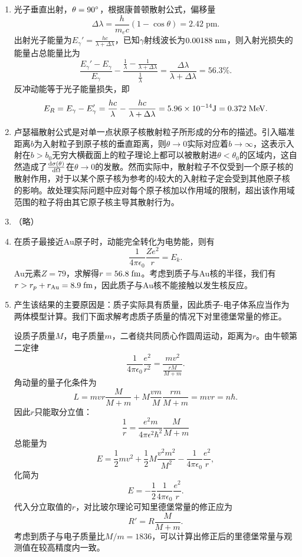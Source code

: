 \begin{enumerate}[label=1.\arabic*, leftmargin=-0.5mm]
\item
光子垂直出射，$\theta=90^\circ$，根据康普顿散射公式，偏移量
\[\Delta\lambda = \frac{h}{m_e c}(1-\cos\theta) = 2.42\;\mathrm{pm}.\]
出射光子能量为$E_\gamma' = \frac{hc}{\lambda+\Delta\lambda}$，已知$\gamma$射线波长为$0.00188\;\mathrm{nm}$，则入射光损失的能量占总能量比为
\[\frac{E_\gamma'-E_\gamma}{E_\gamma} - \frac{\frac{1}{\lambda}-\frac{1}{\lambda+\Delta\lambda}}{\frac{1}{\lambda}} = \frac{\Delta\lambda}{\lambda+\Delta\lambda} = 56.3\%.\]
反冲动能等于光子能量损失，即
\[E_R = E_\gamma-E_\gamma' = \frac{hc}{\lambda}-\frac{hc}{\lambda+\Delta\lambda} = 5.96\times 10^{-14}\mathrm{J} = 0.372\;\mathrm{MeV}.\]

\item
卢瑟福散射公式是对单一点状原子核散射粒子所形成的分布的描述。引入瞄准距离$b$为入射粒子到原子核的垂直距离，则$\theta \rightarrow 0$实际对应着$b \rightarrow \infty$，这表示入射在$b>b_0$无穷大横截面上的粒子理论上都可以被散射进$\theta < \theta_0$的区域内，这自然造成了$\dv{\sigma(\theta)}{\Omega}$在$\theta \rightarrow 0$的发散。然而实际中，散射粒子不仅受到一个原子核的散射作用，对于以某个原子核为参考的$b$较大的入射粒子定会受到其他原子核的影响。故处理实际问题中应对每个原子核加以作用域的限制，超出该作用域范围的粒子将由其它原子核主导其散射行为。

\item
（略）

\item
在质子最接近Au原子时，动能完全转化为电势能，则有
\[\frac{1}{4\pi\epsilon_0}\frac{Ze^2}{r} = E_k.\]
Au元素$Z=79$，求解得$r=56.8\;\mathrm{fm}$。考虑到质子与Au核的半径，我们有$r>r_p+r_\mathrm{Au} = 8.9\;\mathrm{fm}$，因此质子与Au核不能接触以发生核反应。

\item
产生该结果的主要原因是：质子实际具有质量，因此质子-电子体系应当作为两体模型计算。我们下面求解考虑质子质量的情况下对里德堡常量的修正。

设质子质量$M$，电子质量$m$，二者绕共同质心作圆周运动，距离为$r$。由牛顿第二定律
\[\frac{1}{4\pi\epsilon_0}\frac{e^2}{r^2} = \frac{mv^2}{\frac{rM}{M+m}}.\]
角动量的量子化条件为
\[L = mvr\frac{M}{M+m}+M\frac{vm}{M}\frac{rm}{M+m} = mvr = n\hbar.\]
因此$r$只能取分立值：
\[\frac{1}{r} = \frac{e^2 m}{4\pi\epsilon^2\hbar^2}\frac{M}{M+m}\]
总能量为
\[E = \frac{1}{2}mv^2+\frac{1}{2}M\frac{v^2m^2}{M^2}-\frac{1}{4\pi\epsilon_0}\frac{e^2}{r}, \]
化简为
\[E = -\frac{1}{2}\frac{1}{4\pi\epsilon_0}\frac{e^2}{r}.\]
代入分立取值的$r$，对比玻尔理论可知里德堡常量的修正应为
\[R' = R\frac{M}{M+m}.\]
考虑到质子与电子质量比$M/m=1836$，可以计算出修正后的里德堡常量与观测值在较高精度内一致。


\end{enumerate}
